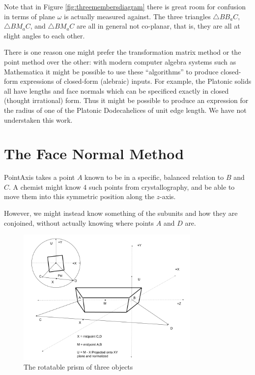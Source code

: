 \documentclass[11pt]{article}
\begin{document}
{Note that in Figure \ref{fig:threemembersdiagram} there is great
room for confusion in terms of plane $\omega$ is actually
measured against. The three triangles $\triangle BB_aC$, $\triangle BM_aC$, and $\triangle BM_aC$
are all in general not co-planar, that is, they are all at
slight angles to each other.

There is one reason one might prefer the transformation matrix method or the point method over the other: with modern
computer algebra systems such as Mathematica it might be possible to use these ``algorithms'' to produce closed-form
expressions of closed-form (alebraic) inputs. For example, the Platonic solids all have lengths and face normals which
can be specificed exactly in closed (thought irrational) form. Thus it might be possible to produce an expression for the
radius of one of the Platonic Dodecahelices of unit edge length. We have not understaken this work.


\section{The Face Normal Method}
\label{sec:facenormal}

PointAxis takes a point $A$ known to be in a specific, balanced relation
to $B$ and $C$. A chemist might know 4 such points from crystallography,
and be able to move them into this symmetric position along the $z$-axis.

However, we might instead know something of the subunits and
how they are conjoined, without actually knowing where points $A$
and $D$ are.


\begin{figure}
     \centering
     \includegraphics[width=0.80\textwidth]{figures/ObjectForStackingSetup.png}
     \caption{The rotatable prism of three objects}
  \label{fig:intrinsicdiagram}
\end{figure}

}
\end{document}
